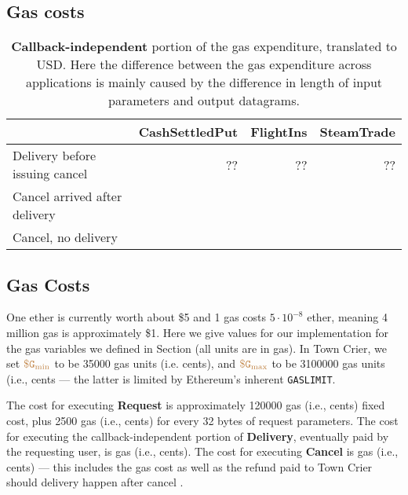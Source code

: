\subsection{Gas costs}

\begin{table*}[ht]
\centering
\begin{tabular}{lr|r|r}
\toprule
& \multicolumn{1}{c|}{\sf CashSettledPut} &
  \multicolumn{1}{c|}{\sf FlightIns} &
  \multicolumn{1}{c}{\sf SteamTrade} \\
\midrule
Delivery before issuing cancel & ?? & ?? & ?? \\ 
Cancel arrived after delivery & & & \\ 
Cancel, no delivery & & & \\ 
\bottomrule
\end{tabular}
\caption{{\bf Callback-independent} portion of the gas expenditure, translated
to USD.  Here the difference between the gas expenditure across applications
is mainly caused 
by the difference in length of input parameters and output datagrams.
}
\label{tab:eval_gas}
\end{table*}



\subsection{Gas Costs}
One ether is currently worth about \$5 and 1 gas costs $5 \cdot 10^{-8}$ ether, meaning 4 million gas is approximately \$1.
Here we give values for our implementation for the gas variables we defined in Section  (all units are in gas).
In Town Crier, we set $\tt {\color{brown} \$G_\text{min} }$ to be 35000 gas units (i.e.   cents),
and $\tt {\color{brown} \$G_\text{max} }$ to be 3100000 gas units (i.e.,  cents --- the latter is limited by 
Ethereum's inherent {\tt GASLIMIT}.

The cost for executing {\bf Request} is approximately \num[group-separator={,}]{120000} 
gas (i.e.,  cents) 
fixed cost, 
plus \num[group-separator={,}]{2500} gas (i.e.,  cents) 
for every 32 bytes of request parameters.
The cost for executing the callback-independent portion of {\bf Delivery}, eventually paid
by the requesting user, is  gas (i.e.,  cents).
The cost for executing {\bf Cancel} is  gas (i.e.,  cents) ---
this includes 
the gas cost  
as well as the refund paid to Town 
Crier should delivery happen after cancel
.




